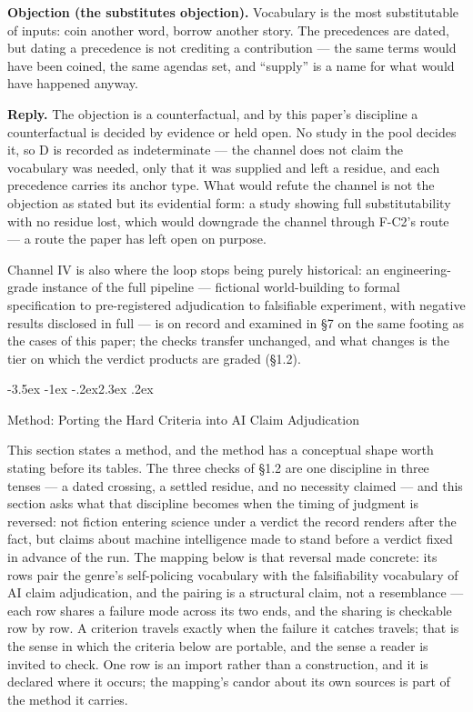 \documentclass[11pt,a4paper]{article}
\makeatletter
\renewcommand\section{\@startsection{section}{1}{\z@}%
  {-3.5ex \@plus -1ex \@minus -.2ex}{2.3ex \@plus .2ex}%
  {\normalfont\Large\bfseries\raggedright}}
\makeatother
\begin{document}
\textbf{Objection (the substitutes objection).} Vocabulary is the most substitutable of inputs: coin another word, borrow another story. The precedences are dated, but dating a precedence is not crediting a contribution — the same terms would have been coined, the same agendas set, and ``supply'' is a name for what would have happened anyway.

\textbf{Reply.} The objection is a counterfactual, and by this paper's discipline a counterfactual is decided by evidence or held open. No study in the pool decides it, so D is recorded as indeterminate — the channel does not claim the vocabulary was needed, only that it was supplied and left a residue, and each precedence carries its anchor type. What would refute the channel is not the objection as stated but its evidential form: a study showing full substitutability with no residue lost, which would downgrade the channel through F-C2's route — a route the paper has left open on purpose.

Channel IV is also where the loop stops being purely historical: an engineering-grade instance of the full pipeline — fictional world-building to formal specification to pre-registered adjudication to falsifiable experiment, with negative results disclosed in full — is on record and examined in §7 on the same footing as the cases of this paper; the checks transfer unchanged, and what changes is the tier on which the verdict products are graded (§1.2).

\section{Method: Porting the Hard Criteria into AI Claim Adjudication}

This section states a method, and the method has a conceptual shape worth stating before its tables. The three checks of §1.2 are one discipline in three tenses — a dated crossing, a settled residue, and no necessity claimed — and this section asks what that discipline becomes when the timing of judgment is reversed: not fiction entering science under a verdict the record renders after the fact, but claims about machine intelligence made to stand before a verdict fixed in advance of the run. The mapping below is that reversal made concrete: its rows pair the genre's self-policing vocabulary with the falsifiability vocabulary of AI claim adjudication, and the pairing is a structural claim, not a resemblance — each row shares a failure mode across its two ends, and the sharing is checkable row by row. A criterion travels exactly when the failure it catches travels; that is the sense in which the criteria below are portable, and the sense a reader is invited to check. One row is an import rather than a construction, and it is declared where it occurs; the mapping's candor about its own sources is part of the method it carries.
\end{document}
